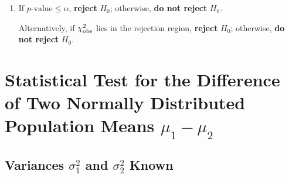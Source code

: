 \documentclass[twoside]{book}
\begin{document}
\begin{enumerate}
	\item If \(p\text{-value} \le \alpha\), \textbf{reject} \(H_0\); otherwise, \textbf{do not reject} \(H_0\).

	Alternatively, if \(\chi^2_{\rm obs}\) lies in the rejection region, \textbf{reject} \(H_0\); otherwise, \textbf{do not reject} \(H_0\).
\end{enumerate}

\section{Statistical Test for the Difference of Two Normally Distributed Population Means \(\mu_1 - \mu_2\)}

\subsection{Variances $\sigma_1^2$ and $\sigma_2^2$ Known}
\end{document}
